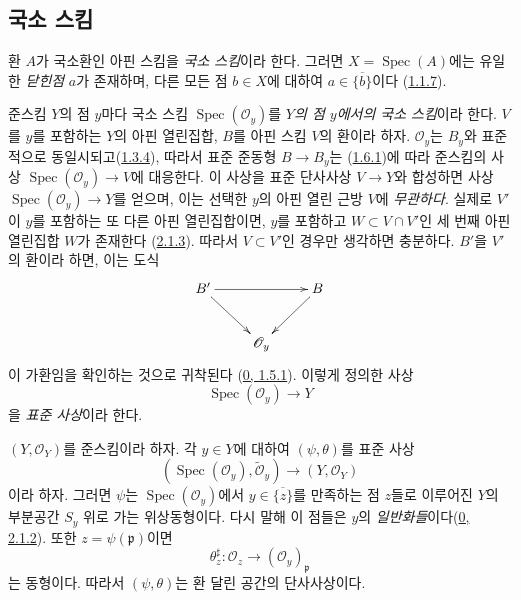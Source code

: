 \subsection{국소 스킴}
\label{subsection:I.2.4-ko}

\begin{env}[2.4.1]
\label{I.2.4.1-ko}
환 $A$가 국소환인 아핀 스킴을 \emph{국소 스킴}이라 한다. 그러면
$X=\operatorname{Spec}(A)$에는 유일한 \emph{닫힌점} $a$가 존재하며,
다른 모든 점 $b\in X$에 대하여
$a\in\overline{\{b\}}$이다
(\hyperref[I.1.1.7-ko]{1.1.7}).
\end{env}

준스킴 $Y$의 점 $y$마다 국소 스킴
$\operatorname{Spec}(\mathscr{O}_y)$를 \emph{$Y$의 점 $y$에서의 국소
스킴}이라 한다. $V$를 $y$를 포함하는 $Y$의 아핀 열린집합, $B$를 아핀
스킴 $V$의 환이라 하자. $\mathscr{O}_y$는 $B_y$와 표준적으로
동일시되고(\hyperref[I.1.3.4-ko]{1.3.4}), 따라서 표준 준동형
$B\to B_y$는 (\hyperref[I.1.6.1-ko]{1.6.1})에 따라 준스킴의 사상
$\operatorname{Spec}(\mathscr{O}_y)\to V$에 대응한다. 이 사상을 표준
단사사상 $V\to Y$와 합성하면 사상
$\operatorname{Spec}(\mathscr{O}_y)\to Y$를 얻으며, 이는 선택한
$y$의 아핀 열린 근방 $V$에 \emph{무관하다}. 실제로 $V'$이 $y$를
포함하는 또 다른 아핀 열린집합이면, $y$를 포함하고
$W\subset V\cap V'$인 세 번째 아핀 열린집합 $W$가 존재한다
(\hyperref[I.2.1.3-ko]{2.1.3}). 따라서 $V\subset V'$인 경우만
생각하면 충분하다. $B'$을 $V'$의 환이라 하면, 이는 도식
\label{I.2.4.1.diagram-ko}
\[
  \xymatrix{
    B'\ar[rr]\ar[dr] & & B\ar[dl]\\
    & \mathscr{O}_y
  }
\]
이 가환임을 확인하는 것으로 귀착된다
(\hyperref[0.1.5.1-ko]{0, 1.5.1}). 이렇게 정의한 사상
\[
  \operatorname{Spec}(\mathscr{O}_y)\longrightarrow Y
\]
을 \emph{표준 사상}이라 한다.

\begin{proposition}[2.4.2]
\label{I.2.4.2-ko}
$(Y,\mathscr{O}_Y)$를 준스킴이라 하자. 각 $y\in Y$에 대하여
$(\psi,\theta)$를 표준 사상
\[
  (\operatorname{Spec}(\mathscr{O}_y),\widetilde{\mathscr{O}}_y)
  \longrightarrow(Y,\mathscr{O}_Y)
\]
이라 하자. 그러면 $\psi$는 $\operatorname{Spec}(\mathscr{O}_y)$에서
$y\in\overline{\{z\}}$를 만족하는 점 $z$들로 이루어진 $Y$의 부분공간
$S_y$ 위로 가는 위상동형이다. 다시 말해 이 점들은 $y$의
\emph{일반화들}이다(\hyperref[0.2.1.2-ko]{0, 2.1.2}). 또한
$z=\psi(\mathfrak{p})$이면
\[
  \theta_z^{\sharp}:\mathscr{O}_z\longrightarrow
  (\mathscr{O}_y)_{\mathfrak{p}}
\]
는 동형이다. 따라서 $(\psi,\theta)$는 환 달린 공간의 단사사상이다.
\end{proposition}

